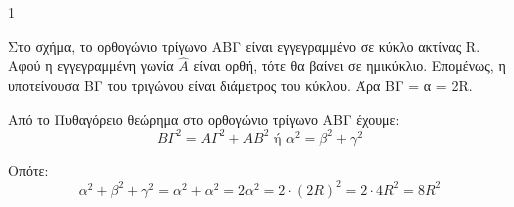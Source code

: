 \begin{ylh}{1}
    \item[ΛΥΣΗ]
\end{ylh}
\begin{figure}
    \centering
\end{figure}
\begin{alist}
    \item Στο σχήμα, το ορθογώνιο τρίγωνο ΑΒΓ είναι εγγεγραμμένο σε κύκλο ακτίνας R. Αφού η εγγεγραμμένη γωνία $\hat{A}$ είναι ορθή, τότε θα βαίνει σε ημικύκλιο. Επομένως, η υποτείνουσα ΒΓ του τριγώνου είναι διάμετρος του κύκλου. Άρα ΒΓ = α = 2R.
    \item Από το Πυθαγόρειο θεώρημα στο ορθογώνιο τρίγωνο ΑΒΓ έχουμε:
    \[ ΒΓ^2 = ΑΓ^2 + ΑΒ^2 \text{ ή } α^2 = β^2 + γ^2 \]
\end{alist}
Οπότε:
\[ α^2 + β^2 + γ^2 = α^2 + α^2 = 2α^2 = 2 \cdot (2R)^2 = 2 \cdot 4R^2 = 8R^2 \]